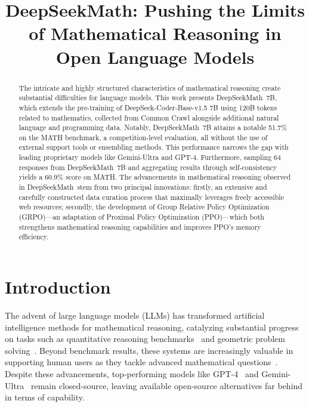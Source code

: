 \title{DeepSeekMath: Pushing the Limits of Mathematical Reasoning in Open Language Models}

\begin{abstract}
The intricate and highly structured characteristics of mathematical reasoning create substantial difficulties for language models. This work presents DeepSeekMath~7B, which extends the pre-training of DeepSeek-Coder-Base-v1.5 7B using 120B tokens related to mathematics, collected from Common Crawl alongside additional natural language and programming data. Notably, DeepSeekMath~7B attains a notable 51.7\% on the MATH benchmark, a competition-level evaluation, all without the use of external support tools or ensembling methods. This performance narrows the gap with leading proprietary models like Gemini-Ultra and GPT-4. Furthermore, sampling 64 responses from DeepSeekMath~7B and aggregating results through self-consistency yields a 60.9\% score on MATH. The advancements in mathematical reasoning observed in DeepSeekMath~stem from two principal innovations: firstly, an extensive and carefully constructed data curation process that maximally leverages freely accessible web resources; secondly, the development of Group Relative Policy Optimization (GRPO)—an adaptation of Proximal Policy Optimization (PPO)—which both strengthens mathematical reasoning capabilities and improves PPO's memory efficiency.
\end{abstract}

\section{Introduction}

The advent of large language models (LLMs) has transformed artificial intelligence methods for mathematical reasoning, catalyzing substantial progress on tasks such as quantitative reasoning benchmarks~\citep{MATH} and geometric problem solving~\citep{trinh2024solving}. Beyond benchmark results, these systems are increasingly valuable in supporting human users as they tackle advanced mathematical questions~\citep{tao}. Despite these advancements, top-performing models like GPT-4~\citep{gpt4} and Gemini-Ultra~\citep{gemini} remain closed-source, leaving available open-source alternatives far behind in terms of capability.

